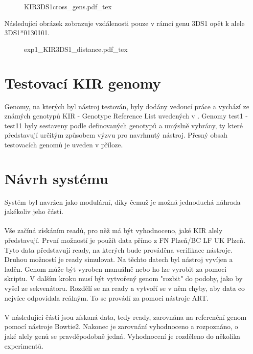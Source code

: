 \documentclass[czech,DP]{thesiskiv}
\numberwithin{equation}{section}
\begin{document}
\begin{figure}[H]
    \centering
    \def\svgwidth{\columnwidth}
    {KIR3DS1cross_gens.pdf_tex} 
\end{figure}

\noindent
Následující obrázek zobrazuje vzdálenosti pouze v rámci genu 3DS1 opět k alele 3DS1*0130101.
\begin{figure}[H]
	\centering
    \def\svgwidth{300px}
    {exp1_KIR3DS1_distance.pdf_tex} 
\end{figure}

\section{Testovací KIR genomy}
Genomy, na kterých byl nástroj testován, byly dodány vedoucí práce a vychází ze známých genotypů KIR - Genotype Reference List uvedených v \cite{kir_genotypes_10}. Genomy test1 - test11 byly sestaveny podle definovaných genotypů a umýslně vybrány, ty které představují určitým způsobem výzvu pro navrhnutý nástroj. Přesný obsah testovacích genomů je uveden v příloze.



\section{Návrh systému}
Systém byl navržen jako modulární, díky čemuž je možná jednoduchá náhrada jakékoliv jeho části. 
\\
\\ 
Vše začíná získáním readů, pro něž má být vyhodnoceno, jaké KIR alely představují. První možností je použít data přímo z FN Plzeň/BC LF UK Plzeň. Tyto data představují ready, na kterých bude prováděna verifikace nástroje. Druhou možností je ready simulovat. Na těchto datech byl nástroj vyvíjen a laděn. Genom může být vyroben manuálně nebo ho lze vyrobit za pomoci skriptu. V dalším kroku musí být vytvořený genom "rozbit" \space do podoby, jako by vyšel ze sekvenátoru. Rozdělí se na ready a vytvoří se v něm chyby, aby data co nejvíce odpovídala reálným. To se provádí za pomoci nástroje ART.
\\
\\
V následující části jsou získaná data, tedy ready, zarovnána na referenční genom pomocí nástroje Bowtie2. Nakonec je zarovnání vyhodnoceno a rozpoznáno, o jaké alely genů se pravděpodobně jedná. Vyhodnocení je rozděleno do několika experimentů.
\end{document}
